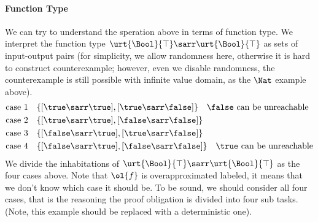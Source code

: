 \paragraph{Function Type} We can try to understand the speration above in terms of function type. We interpret the function type $\urt{\Bool}{\top}\sarr\urt{\Bool}{\top}$ as sets of input-output pairs (for simplicity, we allow randomness here, otherwise it is hard to construct counterexample; however, even we disable randomness, the counterexample is still possible with infinite value domain, as the $\Nat$ example above).
\begin{align*}
    \text{case 1}\quad &\{[\true \sarr \true], [\true \sarr \false]\} \quad \text{$\false$ can be unreachable}
    \\\text{case 2}\quad &\{[\true \sarr \true], [\false \sarr \false]\}
    \\\text{case 3}\quad &\{[\false \sarr \true], [\true \sarr \false]\}
    \\\text{case 4}\quad &\{[\false \sarr \true], [\false \sarr \false]\} \quad \text{$\true$ can be unreachable}
\end{align*}\noindent
We divide the inhabitations of $\urt{\Bool}{\top}\sarr\urt{\Bool}{\top}$ as the four cases above. Note that $\ol{f}$ is overapproximated labeled, it means that we don't know which case it should be. To be sound, we should consider all four cases, that is the reasoning the proof obligation is divided into four sub tasks. (Note, this example should be replaced with a deterministic one).

